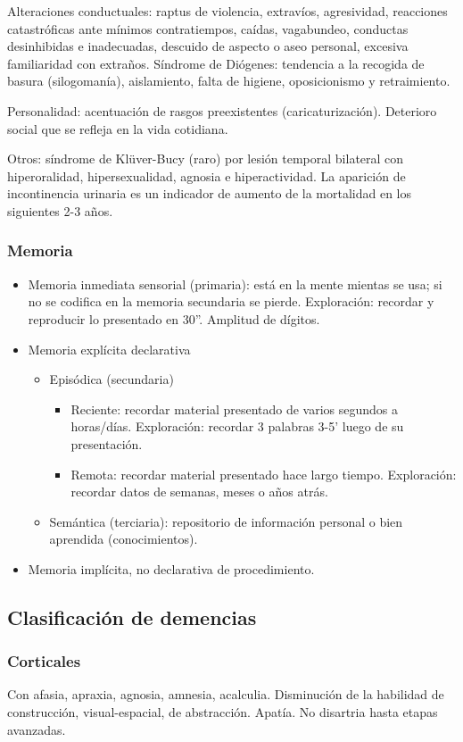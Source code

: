\documentclass{scrbook}
\begin{document}
Alteraciones conductuales: raptus de violencia, extravíos, agresividad, reacciones catastróficas ante mínimos contratiempos, caídas, vagabundeo, conductas desinhibidas e inadecuadas, descuido de aspecto o aseo personal, excesiva familiaridad con extraños. Síndrome de Diógenes: tendencia a la recogida de basura (silogomanía), aislamiento, falta de higiene, oposicionismo y retraimiento.

Personalidad: acentuación de rasgos preexistentes (caricaturización). Deterioro social que se refleja en la vida cotidiana.

Otros: síndrome de Klüver-Bucy (raro) por lesión temporal bilateral con hiperoralidad, hipersexualidad, agnosia e hiperactividad. La aparición de incontinencia urinaria es un indicador de aumento de la mortalidad en los siguientes 2-3 años.
\subsubsection*{Memoria}
\begin{itemize}
	\item Memoria inmediata sensorial (primaria): está en la mente mientas se usa; si no se codifica en la memoria secundaria se pierde. Exploración: recordar y reproducir lo presentado en 30”. Amplitud de dígitos.
	\item Memoria explícita declarativa
	\begin{itemize}
		\item Episódica (secundaria)
		\begin{itemize}
			\item Reciente: recordar material presentado de varios segundos a horas/días. Exploración: recordar 3 palabras 3-5’ luego de su presentación.
			\item Remota: recordar material presentado hace largo tiempo. Exploración: recordar datos de semanas, meses o años atrás.
		\end{itemize}
		\item Semántica (terciaria): repositorio de información personal o bien aprendida (conocimientos).
	\end{itemize}
	\item Memoria implícita, no declarativa de procedimiento.
\end{itemize}
\subsection*{Clasificación de demencias}
\subsubsection*{Corticales}
Con afasia, apraxia, agnosia, amnesia, acalculia. Disminución de la habilidad de construcción, visual-espacial, de abstracción. Apatía. No disartria hasta etapas avanzadas.
\end{document}
